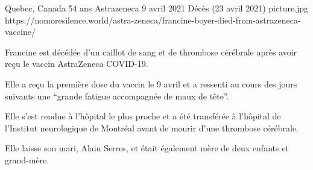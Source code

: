 {Quebec, Canada}
{54 ans}
{Astrazeneca}
{9 avril 2021}
{Décès (23 avril 2021)}
{picture.jpg}
{https://nomoresilence.world/astra-zeneca/francine-boyer-died-from-astrazeneca-vaccine/}
{

Francine est décédée d'un caillot de sang et de thrombose cérébrale après avoir
reçu le vaccin AstraZeneca COVID-19.

Elle a reçu la première dose du vaccin le 9 avril et a ressenti au cours des
jours suivants une “grande fatigue accompagnée de maux de tête”.

Elle s'est rendue à l'hôpital le plus proche et a été transférée à l'hôpital de
l'Institut neurologique de Montréal avant de mourir d'une thrombose cérébrale.

Elle laisse son mari, Alain Serres, et était également mère de deux enfants et
grand-mère.

}
